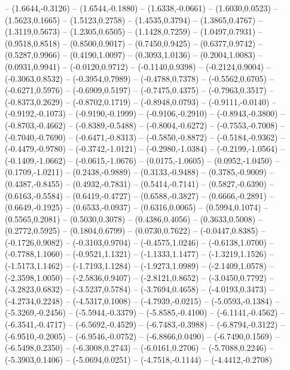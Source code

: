 {	-- (1.6644,-0.3126)
	-- (1.6544,-0.1880)
	-- (1.6338,-0.0661)
	-- (1.6030,0.0523)
	-- (1.5623,0.1665)
	-- (1.5123,0.2758)
	-- (1.4535,0.3794)
	-- (1.3865,0.4767)
	-- (1.3119,0.5673)
	-- (1.2305,0.6505)
	-- (1.1428,0.7259)
	-- (1.0497,0.7931)
	-- (0.9518,0.8518)
	-- (0.8500,0.9017)
	-- (0.7450,0.9425)
	-- (0.6377,0.9742)
	-- (0.5287,0.9966)
	-- (0.4190,1.0097)
	-- (0.3093,1.0136)
	-- (0.2004,1.0083)
	-- (0.0931,0.9941)
	-- (-0.0120,0.9712)
	-- (-0.1140,0.9398)
	-- (-0.2124,0.9004)
	-- (-0.3063,0.8532)
	-- (-0.3954,0.7989)
	-- (-0.4788,0.7378)
	-- (-0.5562,0.6705)
	-- (-0.6271,0.5976)
	-- (-0.6909,0.5197)
	-- (-0.7475,0.4375)
	-- (-0.7963,0.3517)
	-- (-0.8373,0.2629)
	-- (-0.8702,0.1719)
	-- (-0.8948,0.0793)
	-- (-0.9111,-0.0140)
	-- (-0.9192,-0.1073)
	-- (-0.9190,-0.1999)
	-- (-0.9106,-0.2910)
	-- (-0.8943,-0.3800)
	-- (-0.8703,-0.4662)
	-- (-0.8389,-0.5488)
	-- (-0.8004,-0.6272)
	-- (-0.7553,-0.7008)
	-- (-0.7040,-0.7690)
	-- (-0.6471,-0.8313)
	-- (-0.5850,-0.8872)
	-- (-0.5184,-0.9362)
	-- (-0.4479,-0.9780)
	-- (-0.3742,-1.0121)
	-- (-0.2980,-1.0384)
	-- (-0.2199,-1.0564)
	-- (-0.1409,-1.0662)
	-- (-0.0615,-1.0676)
	-- (0.0175,-1.0605)
	-- (0.0952,-1.0450)
	-- (0.1709,-1.0211)
	-- (0.2438,-0.9889)
	-- (0.3133,-0.9488)
	-- (0.3785,-0.9009)
	-- (0.4387,-0.8455)
	-- (0.4932,-0.7831)
	-- (0.5414,-0.7141)
	-- (0.5827,-0.6390)
	-- (0.6163,-0.5584)
	-- (0.6419,-0.4727)
	-- (0.6588,-0.3827)
	-- (0.6666,-0.2891)
	-- (0.6649,-0.1925)
	-- (0.6533,-0.0937)
	-- (0.6316,0.0065)
	-- (0.5994,0.1074)
	-- (0.5565,0.2081)
	-- (0.5030,0.3078)
	-- (0.4386,0.4056)
	-- (0.3633,0.5008)
	-- (0.2772,0.5925)
	-- (0.1804,0.6799)
	-- (0.0730,0.7622)
	-- (-0.0447,0.8385)
	-- (-0.1726,0.9082)
	-- (-0.3103,0.9704)
	-- (-0.4575,1.0246)
	-- (-0.6138,1.0700)
	-- (-0.7788,1.1060)
	-- (-0.9521,1.1321)
	-- (-1.1333,1.1477)
	-- (-1.3219,1.1526)
	-- (-1.5173,1.1462)
	-- (-1.7193,1.1284)
	-- (-1.9273,1.0989)
	-- (-2.1409,1.0578)
	-- (-2.3598,1.0050)
	-- (-2.5836,0.9407)
	-- (-2.8121,0.8652)
	-- (-3.0450,0.7792)
	-- (-3.2823,0.6832)
	-- (-3.5237,0.5784)
	-- (-3.7694,0.4658)
	-- (-4.0193,0.3473)
	-- (-4.2734,0.2248)
	-- (-4.5317,0.1008)
	-- (-4.7939,-0.0215)
	-- (-5.0593,-0.1384)
	-- (-5.3269,-0.2456)
	-- (-5.5944,-0.3379)
	-- (-5.8585,-0.4100)
	-- (-6.1141,-0.4562)
	-- (-6.3541,-0.4717)
	-- (-6.5692,-0.4529)
	-- (-6.7483,-0.3988)
	-- (-6.8794,-0.3122)
	-- (-6.9510,-0.2005)
	-- (-6.9546,-0.0752)
	-- (-6.8866,0.0490)
	-- (-6.7490,0.1569)
	-- (-6.5498,0.2350)
	-- (-6.3008,0.2743)
	-- (-6.0161,0.2706)
	-- (-5.7088,0.2246)
	-- (-5.3903,0.1406)
	-- (-5.0694,0.0251)
	-- (-4.7518,-0.1144)
	-- (-4.4412,-0.2708)
}
